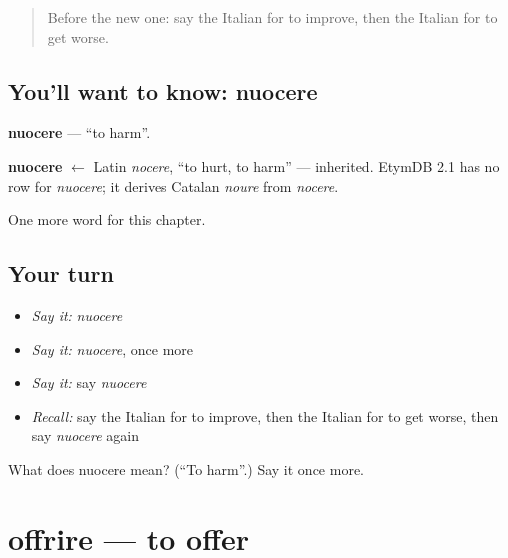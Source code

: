 \label{lesson:IT-C146-nuocere}



\begin{quote}
Before the new one: say the Italian for to improve, then the Italian for to get worse.
\end{quote}

\subsection*{You'll want to know: nuocere}
\textbf{nuocere} — \textquotedblleft{}to harm\textquotedblright{}.

\begin{cousinweb}
\textbf{nuocere} $\leftarrow$ Latin \emph{nocere}, \textquotedblleft{}to hurt, to harm\textquotedblright{} — inherited. EtymDB 2.1 has no row for \emph{nuocere}; it derives Catalan \emph{noure} from \emph{nocere}.
\end{cousinweb}

\begin{grammarlens}[title={What you've built}]
One more word for this chapter.
\end{grammarlens}

\subsection*{Your turn}
\begin{itemize}
\raggedright
  \item \emph{Say it:} \emph{nuocere}
  \item \emph{Say it:} \emph{nuocere}, once more
  \item \emph{Say it:} say \emph{nuocere}
  \item \emph{Recall:} say the Italian for to improve, then the Italian for to get worse, then say \emph{nuocere} again
\end{itemize}

\begin{tcolorbox}[breakable,colback=teal!4,colframe=teal!35!black,title={Before you move on}]
What does nuocere mean? (\textquotedblleft{}To harm\textquotedblright{}.) Say it once more.
\end{tcolorbox}
\section[offrire]{offrire — to offer}

\label{lesson:IT-C146-offrire}



